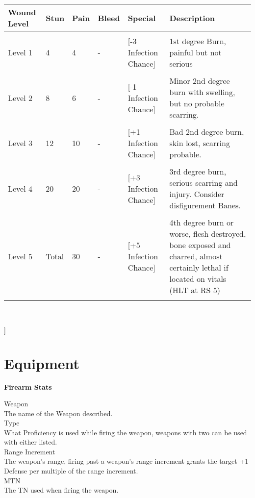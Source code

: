 \documentclass[a4paper, twocolumn, openany]{book}
\newlength{\indentlen}
\newcommand{\tabto}[1]{\setlength{\leftskip}{#1\indentlen}}
\begin{document}
{{{\centering
\begin{tabular}{lllllp{7cm}}
Wound Level 	& Stun 	& Pain 	& Bleed 	& Special 											& Description \\ \hline \\
Level 1 		& 4 	& 4 	& - 		& [-3 Infection Chance]								& 1st degree Burn, painful but not serious \\ \\
Level 2 		& 8 	& 6 	& - 		& [-1 Infection Chance]								& Minor 2nd degree burn with swelling, but no probable scarring. \\ \\
Level 3 		& 12 	& 10 	& - 		& [+1 Infection Chance]								& Bad 2nd degree burn, skin lost, scarring probable. \\ \\
Level 4 		& 20 	& 20 	& - 		& [+3 Infection Chance]								& 3rd degree burn, serious scarring and injury. Consider disfigurement Banes. \\ \\
Level 5 		& Total & 30 	& - 		& [+5 Infection Chance]								& 4th degree burn or worse, flesh destroyed, bone exposed and charred, almost certainly lethal if located on vitals (HLT at RS 5) \\ 
\\ \hline
\end{tabular}\\[\baselineskip] }

}] %

\chapter{Equipment}

{\bfseries Firearm Stats\\}

\tabto{1}
Weapon\\
The name of the Weapon described.\\

Type\\
What Proficiency is used while firing the weapon, weapons with two can be used with either
listed.\\

Range Increment\\
The weapon’s range, firing past a weapon’s range increment grants the target +1 Defense per
multiple of the range increment.\\

MTN\\
The TN used when firing the weapon.\\

}
\end{document}
